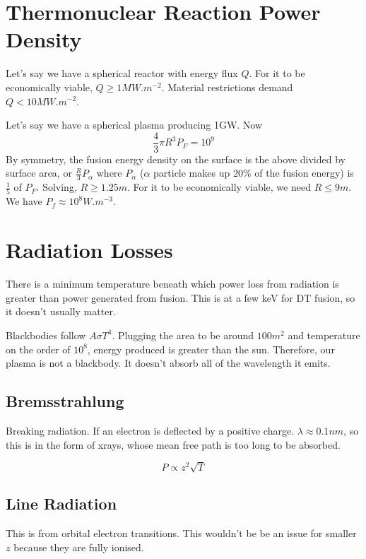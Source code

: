 \documentclass[12pt]{article}
\begin{document}
\section{Thermonuclear Reaction Power Density}

Let's say we have a spherical reactor with energy flux $Q$. For it to be economically viable, $Q \geq 1 \unit{MW.m^{-2}}$. Material restrictions demand $Q < 10\unit{MW.m^{-2}}$.

\begin{ex}
    Let's say we have a spherical plasma producing 1GW. Now
    $$\frac{4}{3}\pi R^3P_F = 10^9$$
    By symmetry, the fusion energy density on the surface is the above divided by surface area, or $\frac{R}{3} P_\alpha$ where $P_\alpha$ ($\alpha$ particle makes up 20\% of the fusion energy) is $\frac{1}{5}$ of $P_F$. Solving, $R \geq 1.25\unit{m}$. For it to be economically viable, we need $R \leq 9\unit{m}$. We have $P_f \approx 10^8 \unit{W.m^{-3}}$.
\end{ex}

\section{Radiation Losses}

There is a minimum temperature beneath which power loss from radiation is greater than power generated from fusion. This is at a few keV for DT fusion, so it doesn't usually matter.

Blackbodies follow $A\sigma T^4$. Plugging the area to be around $100\unit{m^2}$ and temperature on the order of $10^8$, energy produced is greater than the sun. Therefore, our plasma is not a blackbody. It doesn't absorb all of the wavelength it emits.

\subsection{Bremsstrahlung}

Breaking radiation. If an electron is deflected by a positive charge. $\lambda \approx 0.1\unit{nm}$, so this is in the form of xrays, whose mean free path is too long to be absorbed.

$$P \propto z^2\sqrt{T}$$

\subsection{Line Radiation}

This is from orbital electron transitions. This wouldn't be be an issue for smaller $z$ because they are fully ionised.
\end{document}
